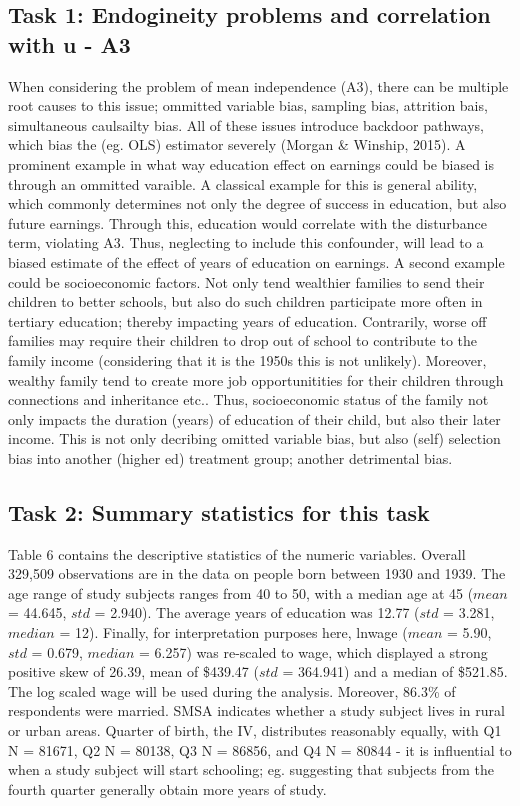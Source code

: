 \documentclass[a4paper]{article}
\begin{document}
\subsection{Task 1: Endogineity problems and correlation with u - A3}
When considering the problem of mean independence (A3), there can be multiple root causes to this issue; ommitted variable bias, sampling bias, attrition bais, simultaneous caulsailty bias. All of these issues introduce backdoor pathways, which bias the (eg. OLS) estimator severely (Morgan \& Winship, 2015). 
A prominent example in what way education effect on earnings could be biased is through an ommitted varaible. A classical example for this is general ability, which commonly determines not only the degree of success in education, but also future earnings. Through this, education would correlate with the disturbance term, violating A3. Thus, neglecting to include this confounder, will lead to a biased estimate of the effect of years of education on earnings.
A second example could be socioeconomic factors. Not only tend wealthier families to send their children to better schools, but also do such children participate more often in tertiary education; thereby impacting years of education. Contrarily, worse off families may require their children to drop out of school to contribute to the family income (considering that it is the 1950s this is not unlikely). Moreover, wealthy family tend to create more job opportunitities for their children through connections and inheritance etc.. Thus, socioeconomic status of the family not only impacts the duration (years) of education of their child, but also their later income. This is not only decribing omitted variable bias, but also (self) selection bias into another (higher ed) treatment group; another detrimental bias.

\subsection{Task 2: Summary statistics for this task}

Table 6 contains the descriptive statistics of the numeric variables. Overall 329,509 observations are in the data on people born between 1930 and 1939. The age range of study subjects ranges from 40 to 50, with a median age at 45 ($mean$ = 44.645, $std$ = 2.940). The average years of education was 12.77 ($std$ = 3.281, $median$ = 12). Finally, for interpretation purposes here, lnwage ($mean$ = 5.90, $std$ = 0.679, $median$ = 6.257) was re-scaled to wage, which displayed a strong positive skew of 26.39, mean of \$439.47 ($std$ = 364.941) and a median of \$521.85. The log scaled wage will be used during the analysis. 
Moreover, 86.3\% of respondents were married. SMSA indicates whether a study subject lives in rural or urban areas. Quarter of birth, the IV, distributes reasonably equally, with Q1 N = 81671, Q2 N = 80138, Q3 N = 86856, and Q4 N = 80844 - it is influential to when a study subject will start schooling; eg. suggesting that subjects from the fourth quarter generally obtain more years of study.  
\end{document}

